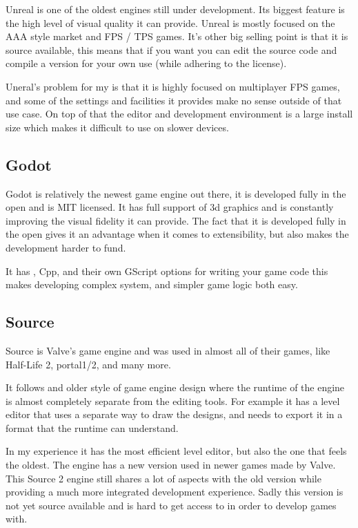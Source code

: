 Unreal is one of the oldest engines still under development. Its biggest feature is the high level of visual quality it can provide. Unreal is mostly focused on the AAA style market and FPS / TPS games. It's other big selling point is that it is source available, this means that if you want you can edit the source code and compile a version for your own use (while adhering to the license).

Uneral's problem for my is that it is highly focused on multiplayer FPS games, and some of the settings and facilities it provides make no sense outside of that use case. On top of that the editor and development environment is a large install size which makes it difficult to use on slower devices.

\subsection{Godot}

Godot is relatively the newest game engine out there, it is developed fully in the open and is MIT licensed. It has full support of 3d graphics and is constantly improving the visual fidelity it can provide. The fact that it is developed fully in the open gives it an advantage when it comes to extensibility, but also makes the development harder to fund.

It has \Csh, Cpp, and their own GScript options for writing your game code this makes developing complex system, and simpler game logic both easy.

\subsection{Source}

Source is Valve's game engine and was used in almost all of their games, like Half-Life 2, portal1/2, and many more.

It follows and older style of game engine design where the runtime of the engine is almost completely separate from the editing tools. For example it has a level editor that uses a separate way to draw the designs, and needs to export it in a format that the runtime can understand.

In my experience it has the most efficient level editor, but also the one that feels the oldest. The engine has a new version used in newer games made by Valve. This Source 2 engine still shares a lot of aspects with the old version while providing a much more integrated development experience. Sadly this version is not yet source available and is hard to get access to in order to develop games with.


